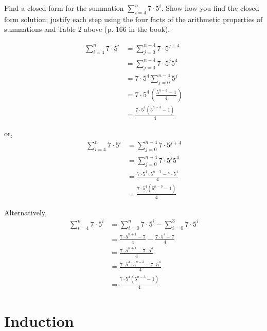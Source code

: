 \begin{questions}
 Find a closed form for the summation $\displaystyle \sum_{i=4}^n 7\cdot 5^i$.  Show how you find the closed form solution; justify each step using the four facts of the arithmetic properties of summations and Table 2 above (p. 166 in the book).
    \ifprintanswers
        \vspace{-10pt}
   \fi
\begin{solution}
  \begin{align*}
      \sum_{i=4}^n 7\cdot 5^i  &= \sum_{j=0}^{n-4} 7\cdot 5^{j+4} \tag{change of index} \\
       &= \sum_{j=0}^{n-4} 7\cdot 5^{j}5^{4} \tag{algebra} \\
       &= 7\cdot 5^4 \sum_{j=0}^{n-4} 5^j \tag{Fact 4} \\
       &= 7\cdot 5^4 \left( \frac{5^{n-3} - 1}{4}  \right) \tag{Table 2.1} \\
       &= \frac{7\cdot 5^4(5^{n-3} - 1)}{4} \tag{algebra}
  \end{align*}

  or, 
  \begin{align*}
      \sum_{i=4}^n 7\cdot 5^i  &= \sum_{j=0}^{n-4} 7\cdot 5^{j+4} \tag{change of index} \\
       &= \sum_{j=0}^{n-4} 7\cdot 5^{j}5^{4} \tag{algebra} \\
       &= \frac{7\cdot 5^4 \cdot 5^{n-3} - 7\cdot 5^4}{4} \tag{Table 2.1} \\
       &= \frac{7\cdot 5^4(5^{n-3} - 1)}{4} \tag{algebra}
  \end{align*}

  Alternatively, 
  \begin{align*}
    \sum_{i=4}^n 7\cdot5^i  &= \sum_{i=0}^n 7\cdot5^i - \sum_{i=0}^3 7\cdot5^i \tag{prop. of sum }\\
      &= \frac{7\cdot5^{n+1} - 7}{4} - \frac{7\cdot5^4 - 7}{4} \tag{Table 2.1} \\
      &= \frac{7\cdot5^{n+1} - 7\cdot5^4}{4} \tag{algebra} \\
      &= \frac{7\cdot5^4\cdot5^{n-3} - 7\cdot5^4}{4} \tag{algebra} \\
      &= \frac{7\cdot5^4 (5^{n-3} - 1)}{4}  
  \end{align*}
\end{solution}



\section*{Induction}


\end{questions}
